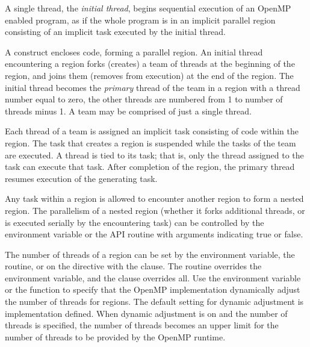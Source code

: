 \label{chap:parallel_execution}

A single thread, the \emph{initial thread}, begins sequential execution of 
an OpenMP enabled program, as if the whole program is in an implicit parallel
region consisting of an implicit task executed by the initial thread.

A  construct encloses code, 
forming a parallel region.  An initial thread encountering a  
region forks (creates) a team of threads at the beginning of the 
 region, and joins them (removes from execution) at the 
end of the region.  The initial thread becomes the \emph{primary} thread of the team in a 
 region with a thread number equal to zero, the other 
threads are numbered from 1 to number of threads minus 1. 
A team may be comprised of just a single thread.

Each thread of a team is assigned an implicit task consisting of code within the 
 region. The task that creates a  region is suspended while the
tasks of the team are executed.  A thread is tied to its task; that is,
only the thread assigned to the task can execute that task.  After completion 
of the  region, the primary thread resumes execution of the generating task.  


Any task within a  region is allowed to encounter another
 region to form a nested  region. The 
parallelism of a nested  region (whether it forks additional 
threads, or is executed serially by the encountering task) can be controlled by the
 environment variable or the  
API routine with arguments indicating true or false.

The number of threads of a  region can be set by the 
environment variable, the  routine, or on the  
directive with the 
clause. The routine overrides the environment variable, and the clause overrides all. 
Use the  environment variable
or the  function to specify that the OpenMP
implementation dynamically adjust the number of threads for
 regions. The default setting for dynamic adjustment is implementation
defined. When dynamic adjustment is on and the number of threads is specified,
the number of threads becomes an upper limit for the number of threads to be
provided by the OpenMP runtime.

